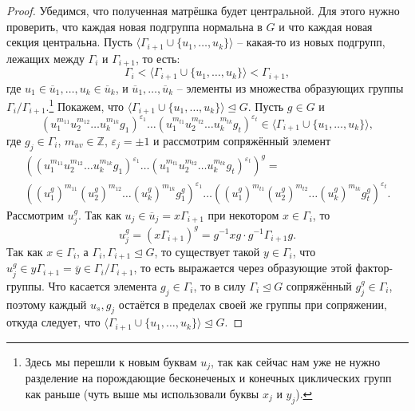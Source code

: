 \documentclass{article}
\begin{document}
\begin{proof}
    Убедимся, что полученная матрёшка будет центральной. Для этого нужно проверить, что каждая новая подгруппа нормальна в $G$ и что каждая новая секция центральна.
    Пусть $\langle \Gamma_{i + 1} \cup \{ u_1, \ldots, u_k \} \rangle$ -- какая-то из новых подгрупп, лежащих между $\Gamma_i$ и $\Gamma_{i+1}$, то есть: $$ \Gamma_i < \langle \Gamma_{i + 1} \cup \{ u_1, \ldots, u_k \} \rangle < \Gamma_{i + 1}, $$ где $u_1 \in \overline{u}_1, \ldots, u_k \in \overline{u}_k$, и $\overline{u}_1, \ldots, \overline{u}_k$ -- элементы из множества образующих группы $\Gamma_i / \Gamma_{i +1}$.\footnote{Здесь мы перешли к новым буквам $u_j$, так как сейчас нам уже не нужно разделение на порождающие бесконеченых и конечных циклических групп как раньше (чуть выше мы использовали буквы $x_j$ и $y_j$).} Покажем, что $ \langle \Gamma_{i + 1} \cup \{ u_1, \ldots, u_k \} \rangle \trianglelefteq G $.
    Пусть $g \in G$ и
    \[
        (u_1^{m_{11}} u_2^{m_{12}} \ldots u_k^{m_{1k}} g_1)^{\varepsilon_1} \ldots (u_1^{m_{t1}} u_2^{m_{t2}} \ldots u_k^{m_{tk}} g_t)^{\varepsilon_t} \in \langle \Gamma_{i + 1} \cup \{ u_1, \ldots, u_k \} \rangle,
    \]
    где $g_j \in \Gamma_{i}$, $m_{uv} \in \mathbb{Z}$, $\varepsilon_j = \pm 1$ и рассмотрим сопряжённый элемент
    \begin{gather*}
        ((u_1^{m_{11}} u_2^{m_{12}} \ldots u_k^{m_{1k}} g_1)^{\varepsilon_1} \ldots (u_1^{m_{t1}} u_2^{m_{t2}} \ldots u_k^{m_{tk}} g_t)^{\varepsilon_t})^g =  \\
        ((u_1^g)^{m_{11}} (u_2^g)^{m_{12}} \ldots (u_k^g)^{m_{1k}} g_1 ^ g)^{\varepsilon_1} \ldots ((u_1^g)^{m_{t1}} (u_2^g)^{m_{t2}} \ldots (u_k^g)^{m_{tk}} g_t^g)^{\varepsilon_t}.
    \end{gather*}
    Рассмотрим $u_j^g$. Так как $u_j \in \overline{u}_j = x \Gamma_{i + 1}$ при некотором $x \in \Gamma_i$, то
    \[
        u_j^g = (x \Gamma_{i + 1})^g = g^{-1}x g \cdot g^{-1} \Gamma_{i + 1} g.
    \]
    Так как $x \in \Gamma_i$, а $\Gamma_i, \Gamma_{i + 1} \trianglelefteq G $, то существует такой $y \in \Gamma_i$, что $u_j^g \in y \Gamma_{i + 1} = \overline{y} \in \Gamma_i / \Gamma_{i + 1}$, то есть выражается через образующие этой фактор-группы. Что касается элемента $g_j \in \Gamma_i$, то в силу $\Gamma_i \trianglelefteq G$ сопряжённый $g_j^g \in \Gamma_i$, поэтому каждый $u_s, g_j$ остаётся в пределах своей же группы при сопряжении, откуда следует, что $ \langle \Gamma_{i + 1} \cup \{ u_1, \ldots, u_k \} \rangle \trianglelefteq G $.


\end{proof}
\end{document}
